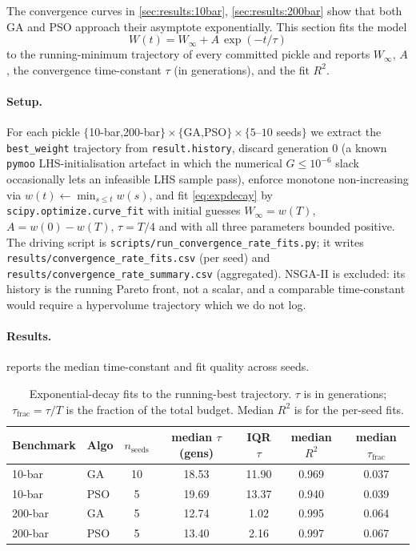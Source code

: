 The convergence curves in \cref{sec:results:10bar},
\cref{sec:results:200bar} show that both GA and PSO approach
their asymptote exponentially. This section fits the model
\begin{equation}
W(t) = W_{\infty} + A\,\exp(-t/\tau)
\label{eq:expdecay}
\end{equation}
to the running-minimum trajectory of every committed pickle and
reports $W_{\infty}$, $A$, the convergence time-constant
$\tau$ (in generations), and the fit $R^2$.

\paragraph{Setup.} For each pickle
$\{$10-bar,200-bar$\}\times\{$GA,PSO$\}\times\{5$--$10$ seeds$\}$
we extract the \texttt{best\_weight} trajectory from
\texttt{result.history}, discard generation $0$ (a known
\texttt{pymoo} LHS-initialisation artefact in which the numerical
$G\le10^{-6}$ slack occasionally lets an infeasible LHS sample
pass), enforce monotone non-increasing via
$w(t)\leftarrow\min_{s\le t}w(s)$, and fit \cref{eq:expdecay}
by \texttt{scipy.optimize.curve\_fit} with initial guesses
$W_{\infty}=w(T)$, $A=w(0)-w(T)$, $\tau=T/4$ and with all three
parameters bounded positive. The driving script is
\texttt{scripts/run\_convergence\_rate\_fits.py}; it writes
\texttt{results/convergence\_rate\_fits.csv} (per seed) and
\texttt{results/convergence\_rate\_summary.csv} (aggregated).
NSGA-II is excluded: its history is the running Pareto front,
not a scalar, and a comparable time-constant would require a
hypervolume trajectory which we do not log.

\paragraph{Results.}  reports the
median time-constant and fit quality across seeds.

\begin{table}[ht]
  \centering
  \caption{Exponential-decay fits to the running-best trajectory.
    $\tau$ is in generations; $\tau_{\text{frac}}=\tau/T$ is the
    fraction of the total budget. Median $R^2$ is for the
    per-seed fits.}
  \label{tab:conv_summary}
  \begin{tabular}{l l S[table-format=2.0] S[table-format=2.2] S[table-format=2.2] S[table-format=1.3] S[table-format=1.3]}
    \toprule
    Benchmark & Algo & {$n_{\text{seeds}}$} & {median $\tau$ (gens)} & {IQR $\tau$} & {median $R^2$} & {median $\tau_{\text{frac}}$} \\
    -bar   & GA  & 10 & 18.53 & 11.90 & 0.969 & 0.037 \\
    10-bar   & PSO &  5 & 19.69 & 13.37 & 0.940 & 0.039 \\
    200-bar  & GA  &  5 & 12.74 &  1.02 & 0.995 & 0.064 \\
    200-bar  & PSO &  5 & 13.40 &  2.16 & 0.997 & 0.067 \\
    \bottomrule
  \end{tabular}
\end{table}


